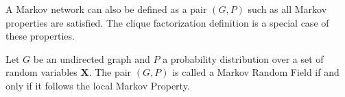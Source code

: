  \begin{remark}
    A Markov network can also be defined as a pair \((G, P)\) such as all Markov
    properties are satisfied. The clique factorization definition is a special
    case of these properties.
  \end{remark}


  \begin{definition}
    Let \(G\) be an undirected graph and \(P\) a probability distribution over a
    set of random variables \(\bm{X}\). The pair \((G, P)\) is called a Markov
    Random Field if and only if it follows the local Markov Property.
  \end{definition}
